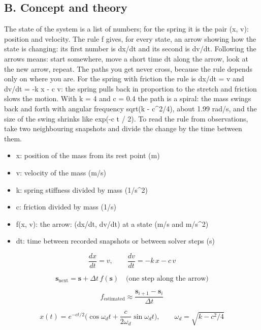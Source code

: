 \documentclass[11pt,a4paper]{article}
\begin{document}
\subsection*{B. Concept and theory}
The state of the system is a list of numbers; for the spring it is the pair (x, v): position and velocity. The rule f gives, for every state, an arrow showing how the state is changing: its first number is dx/dt and its second is dv/dt. Following the arrows means: start somewhere, move a short time dt along the arrow, look at the new arrow, repeat. The paths you get never cross, because the rule depends only on where you are. For the spring with friction the rule is dx/dt = v and dv/dt = -k x - c v: the spring pulls back in proportion to the stretch and friction slows the motion. With k = 4 and c = 0.4 the path is a spiral: the mass swings back and forth with angular frequency sqrt(k - c\textasciicircum{}2/4), about 1.99 rad/s, and the size of the swing shrinks like exp(-c t / 2). To read the rule from observations, take two neighbouring snapshots and divide the change by the time between them.

\begin{itemize}[nosep]
\item x: position of the mass from its rest point (m)
\item v: velocity of the mass (m/s)
\item k: spring stiffness divided by mass (1/s\textasciicircum{}2)
\item c: friction divided by mass (1/s)
\item f(x, v): the arrow: (dx/dt, dv/dt) at a state (m/s and m/s\textasciicircum{}2)
\item dt: time between recorded snapshots or between solver steps (s)
\end{itemize}

\begin{equation*}
\frac{dx}{dt}=v,\qquad \frac{dv}{dt}=-k\,x-c\,v
\end{equation*}

\begin{equation*}
\mathbf s_{\text{next}}=\mathbf s+\Delta t\,f(\mathbf s)\quad\text{(one step along the arrow)}
\end{equation*}

\begin{equation*}
f_{\text{estimated}}\approx\frac{\mathbf s_{i+1}-\mathbf s_i}{\Delta t}
\end{equation*}

\begin{equation*}
x(t)=e^{-ct/2}\Big(\cos\omega_d t+\frac{c}{2\omega_d}\sin\omega_d t\Big),\qquad \omega_d=\sqrt{k-c^2/4}
\end{equation*}
\end{document}
